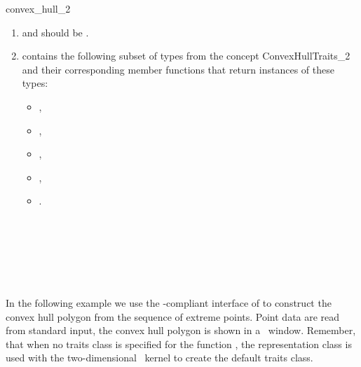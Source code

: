 \begin{ccRefFunction}{convex_hull_2}
\begin{enumerate}
   \item    {} and 
            should be .
   \item    {} contains the following subset of types from
            the concept ConvexHullTraits\_2 and their corresponding member
            functions that return instances of these types:
            \begin{itemize}
                \item {},
                \item {}, 
                \item {},
                \item {}, 
                \item {}.
            \end{itemize}
\end{enumerate}


\ccSeeAlso

 \\
 \\
 \\
 \\
 \\

\ccExample
In the following example we use the \stl-compliant interface of
 to construct the convex hull polygon from the
sequence of extreme points. Point data are read from standard input, the
convex hull polygon is shown in a \cgal\ window.
Remember, that when no traits class is specified for the function
, the representation class  is used 
with the two-dimensional \cgal\ kernel to create the default traits class.


\end{ccRefFunction}


